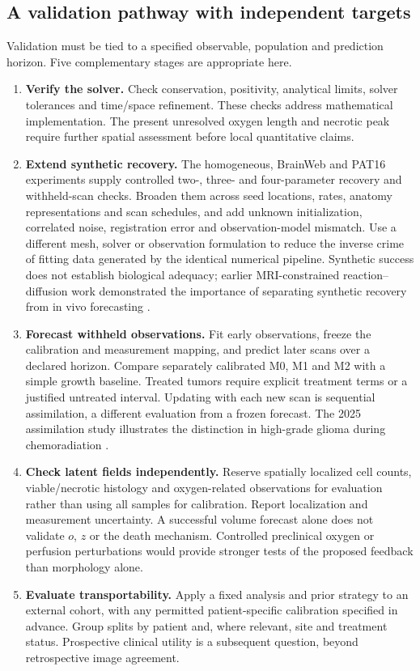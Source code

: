 \subsection{A validation pathway with independent targets}
Validation must be tied to a specified observable, population and prediction horizon. Five complementary stages are appropriate here.
\begin{enumerate}
\item \textbf{Verify the solver.} Check conservation, positivity, analytical limits, solver tolerances and time/space refinement. These checks address mathematical implementation. The present unresolved oxygen length and necrotic peak require further spatial assessment before local quantitative claims.
\item \textbf{Extend synthetic recovery.} The homogeneous, BrainWeb and PAT16 experiments supply controlled two-, three- and four-parameter recovery and withheld-scan checks. Broaden them across seed locations, rates, anatomy representations and scan schedules, and add unknown initialization, correlated noise, registration error and observation-model mismatch. Use a different mesh, solver or observation formulation to reduce the inverse crime of fitting data generated by the identical numerical pipeline. Synthetic success does not establish biological adequacy; earlier MRI-constrained reaction--diffusion work demonstrated the importance of separating synthetic recovery from in vivo forecasting \citep{hormuth2015}.
\item \textbf{Forecast withheld observations.} Fit early observations, freeze the calibration and measurement mapping, and predict later scans over a declared horizon. Compare separately calibrated M0, M1 and M2 with a simple growth baseline. Treated tumors require explicit treatment terms or a justified untreated interval. Updating with each new scan is sequential assimilation, a different evaluation from a frozen forecast. The 2025 assimilation study illustrates the distinction in high-grade glioma during chemoradiation \citep{miniere2025}.
\item \textbf{Check latent fields independently.} Reserve spatially localized cell counts, viable/necrotic histology and oxygen-related observations for evaluation rather than using all samples for calibration. Report localization and measurement uncertainty. A successful volume forecast alone does not validate $o$, $z$ or the death mechanism. Controlled preclinical oxygen or perfusion perturbations would provide stronger tests of the proposed feedback than morphology alone.
\item \textbf{Evaluate transportability.} Apply a fixed analysis and prior strategy to an external cohort, with any permitted patient-specific calibration specified in advance. Group splits by patient and, where relevant, site and treatment status. Prospective clinical utility is a subsequent question, beyond retrospective image agreement.
\end{enumerate}

